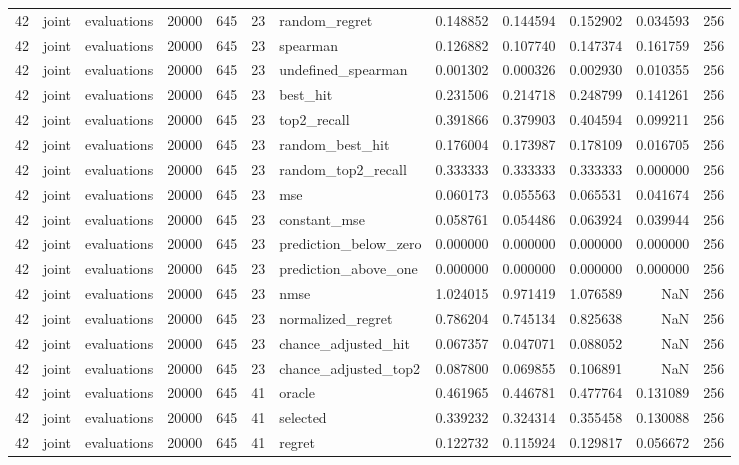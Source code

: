 \begin{tabular}{rllrrrlrrrrr}
42 & joint & evaluations & 20000 & 645 & 23 & random_regret & 0.148852 & 0.144594 & 0.152902 & 0.034593 & 256 \\
42 & joint & evaluations & 20000 & 645 & 23 & spearman & 0.126882 & 0.107740 & 0.147374 & 0.161759 & 256 \\
42 & joint & evaluations & 20000 & 645 & 23 & undefined_spearman & 0.001302 & 0.000326 & 0.002930 & 0.010355 & 256 \\
42 & joint & evaluations & 20000 & 645 & 23 & best_hit & 0.231506 & 0.214718 & 0.248799 & 0.141261 & 256 \\
42 & joint & evaluations & 20000 & 645 & 23 & top2_recall & 0.391866 & 0.379903 & 0.404594 & 0.099211 & 256 \\
42 & joint & evaluations & 20000 & 645 & 23 & random_best_hit & 0.176004 & 0.173987 & 0.178109 & 0.016705 & 256 \\
42 & joint & evaluations & 20000 & 645 & 23 & random_top2_recall & 0.333333 & 0.333333 & 0.333333 & 0.000000 & 256 \\
42 & joint & evaluations & 20000 & 645 & 23 & mse & 0.060173 & 0.055563 & 0.065531 & 0.041674 & 256 \\
42 & joint & evaluations & 20000 & 645 & 23 & constant_mse & 0.058761 & 0.054486 & 0.063924 & 0.039944 & 256 \\
42 & joint & evaluations & 20000 & 645 & 23 & prediction_below_zero & 0.000000 & 0.000000 & 0.000000 & 0.000000 & 256 \\
42 & joint & evaluations & 20000 & 645 & 23 & prediction_above_one & 0.000000 & 0.000000 & 0.000000 & 0.000000 & 256 \\
42 & joint & evaluations & 20000 & 645 & 23 & nmse & 1.024015 & 0.971419 & 1.076589 & NaN & 256 \\
42 & joint & evaluations & 20000 & 645 & 23 & normalized_regret & 0.786204 & 0.745134 & 0.825638 & NaN & 256 \\
42 & joint & evaluations & 20000 & 645 & 23 & chance_adjusted_hit & 0.067357 & 0.047071 & 0.088052 & NaN & 256 \\
42 & joint & evaluations & 20000 & 645 & 23 & chance_adjusted_top2 & 0.087800 & 0.069855 & 0.106891 & NaN & 256 \\
42 & joint & evaluations & 20000 & 645 & 41 & oracle & 0.461965 & 0.446781 & 0.477764 & 0.131089 & 256 \\
42 & joint & evaluations & 20000 & 645 & 41 & selected & 0.339232 & 0.324314 & 0.355458 & 0.130088 & 256 \\
42 & joint & evaluations & 20000 & 645 & 41 & regret & 0.122732 & 0.115924 & 0.129817 & 0.056672 & 256 \\

\end{tabular}

